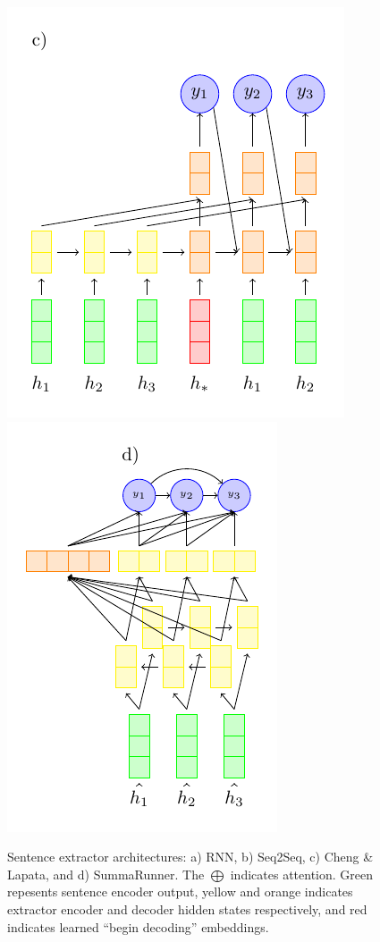 \begin{figure}
  \includegraphics[scale=.65]{figures/clextractor.pdf}
  \includegraphics[scale=.65]{figures/sr_extractor.pdf}
  \caption{Sentence extractor architectures: a) RNN, b) Seq2Seq,
  c) Cheng \& Lapata, and d) SummaRunner. The $\bigoplus$ indicates 
  attention. Green repesents sentence encoder output, yellow and orange
  indicates
  extractor encoder and decoder hidden states respectively, and red indicates
  learned ``begin decoding'' embeddings. }
  \label{fig:extractors}
\end{figure}




